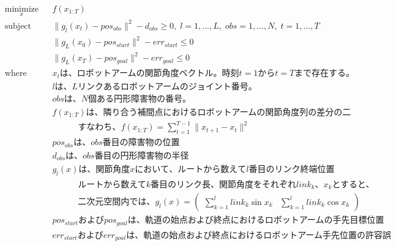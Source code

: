 \begin{equation*}
  \begin{aligned}
    & \underset{x}{\text{minimize}}
    & & f(x_{1:T}) \\
    & \text{subject to}
    & & \|g_{l}(x_t) - pos_{obs}\|^2 - d_{obs} \geq 0, \; l = 1, \ldots, L, \; obs = 1, \ldots, N, \; t = 1, \ldots, T \\
    & \text{}
    & & \|g_L(x_0) - pos_{start}\|^2 - err_{start} \leq 0 \\
    & \text{}
    & & \|g_L(x_T) - pos_{goal}\|^2 - err_{goal} \leq 0 \\
    & \text{where}
    & & x_t\text{は、ロボットアームの関節角度ベクトル。時刻}t=1\text{から}t=T\text{まで存在する。} \\
    & \text{}
    & & l\text{は、}L\text{リンクあるロボットアームのジョイント番号。} \\
    & \text{}
    & & obs\text{は、}N\text{個ある円形障害物の番号。} \\
    & \text{}
    & & f(x_{1:T})\text{は、隣り合う補間点におけるロボットアームの関節角度列の差分の二乗和} \\
    & \text{}
    & & \text{　　　すなわち、}f(x_{1:T}) = \sum_{t=1}^{T-1} \|x_{t+1} - x_t\|^2 \\
    & \text{}
    & & pos_{obs}\text{は、}obs\text{番目の障害物の位置} \\
    & \text{}
    & & d_{obs}\text{は、}obs\text{番目の円形障害物の半径} \\
    & \text{}
    & & g_{l}(x)\text{は、関節角度}x{において、ルートから数えて}l\text{番目のリンク終端位置}\\
    & \text{}
    & & \text{　　　ルートから数えて}k\text{番目のリンク長、関節角度をそれぞれ}link_k\text{、}x_k\text{とすると、}\\
    & \text{}
    & & \text{　　　二次元空間内では、}g_l(x) = \left( \begin{array}{cc} \sum_{k=1}^{l} link_k\sin{x_k} & \sum_{k=1}^{l} link_k\cos{x_k} \end{array} \right)\\
    & \text{}
    & & pos_{start}\text{および}pos_{goal}\text{は、軌道の始点および終点におけるロボットアームの手先目標位置} \\
    & \text{}
    & & err_{start}\text{および}err_{goal}\text{は、軌道の始点および終点におけるロボットアーム手先位置の許容誤差}
  \end{aligned}
\end{equation*}

